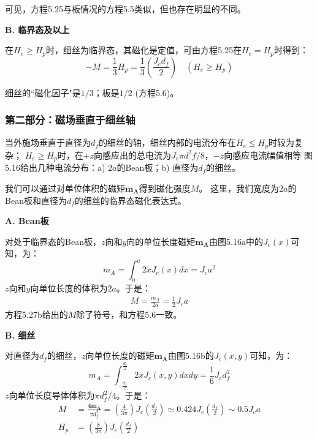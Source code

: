 可见，方程5.25与板情况的方程5.5类似，但也存在明显的不同。

\textbf{B. 临界态及以上}

在$H_e\ge H_p$时，细丝为临界态，其磁化是定值，可由方程5.25在$H_e=H_p$时得到：
\begin{equation}%
-M=\frac{1}{3}H_{p}=\frac{1}{3}(\frac{J_{c}d_{f}}{2})\quad(H_{e}\geq H_{p})
\end{equation}

细丝的``磁化因子"是$1/3$；板是$1/2$ (方程5.6)。

\subsubsection{第二部分：磁场垂直于细丝轴}
当外施场垂直于直径为$d_f$的细丝的轴，细丝内部的电流分布在$H_e\le H_p$时较为复杂；
$H_e\ge H_p$时，在$+z$向感应出的总电流为$J_c \pi d^2 f/8$，$-z$向感应电流幅值相等
图5.16给出几种电流分布：a) $2a$的Bean板；b) 直径为$d_f$的细丝。

我们可以通过对单位体积的磁矩$\mathbf{m_A}$得到磁化强度$M$。
这里，我们宽度为$2a$的Bean板和直径为$d_f$的细丝的临界态磁化表达式。

\textbf{A. Bean板}

对处于临界态的Bean板，$z$向和$y$向的单位长度磁矩$\mathbf{m_A}$由图5.16a中的$J_c(x)$可知，为：
\begin{equation}%
m_{A}=\int_{0}^{a}2xJ_{c}(x)dx=J_{c}a^{2}
\end{equation}
$z$向和$y$向单位长度的体积为$2a$。于是：
\begin{align*}%
M=\frac{m_{A}}{2a}=\frac{1}{2}J_{c}a \tag{5.27b}
\end{align*}
方程5.27b给出的$M$除了符号，和方程5.6一致。

\textbf{B. 细丝}

对直径为$d_f$的细丝，$z$向单位长度的磁矩$\mathbf{m_A}$由图5.16b的$J_c(x,y)$可知，为：
\begin{equation}%
m_{A}=\int_{-\frac{d_{f}}{2}}^{\frac{d_{f}}{2}}2xJ_{c}(x,y)dxdy=\frac{1}{6}J_{c}d_{f}^{2}
\end{equation}
$z$向单位长度导体体积为$\pi d_f^2/4$。于是：
\begin{subequations}
	\begin{align}
M&=\frac{\mathbf{4m_{A}}}{\pi d_{f}^{2}}=(\frac{4}{3\pi})J_{c}(\frac{d_{f}}{2})\simeq0.424J_{c}(\frac{d_{f}}{2})\sim0.5J_{c}a\\
H_{p}&=(\frac{8}{3\pi})J_{c}(\frac{d_{f}}{2})
	\end{align}
\end{subequations}

